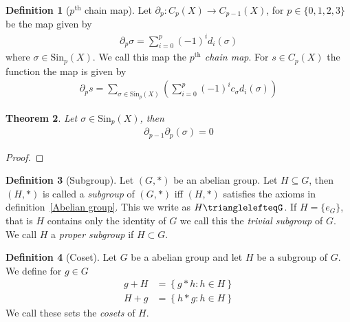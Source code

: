 \documentclass{article}
\theoremstyle{plain}
\newtheorem{theorem}{Theorem}
\theoremstyle{definition}
\newtheorem{definition}[theorem]{Definition}
\newcommand{\Sin}{\text{Sin}}
\newcommand{\del}{\partial}
\begin{document}
\begin{definition}[$p^\text{th}$ chain map]\label{pth chain map}
	Let $\del_p:C_p(X)\rightarrow C_{p-1}(X)$, for $p\in\{0,1,2,3\}$ be the map
	given by
	\begin{equation}
	\begin{aligned}
		\del_p\sigma=\sum^p_{i=0} {(-1)}^i d_i (\sigma)
	\end{aligned}
	\end{equation}
	where $\sigma\in\Sin_p(X)$. We call this map the
	\textit{$p^\text{th}$ chain map}. For $s\in C_p(X)$ the function the map is
	given by
	\begin{equation}
	\begin{aligned}
		\del_ps=\sum_{\sigma\in\Sin_p(X)}\left(\sum^p_{i=0} {(-1)}^i c_\sigma 
			d_i(\sigma)\right)
	\end{aligned}
	\end{equation}
\end{definition}
\begin{theorem}
	Let $\sigma\in\Sin_p(X)$, then
	\begin{equation}
	\begin{aligned}
		\del_{p-1}\del_p(\sigma)=0
	\end{aligned}
	\end{equation}
\end{theorem}
\begin{proof}
\end{proof}
\begin{definition}[Subgroup]\label{subgroup}
	Let $(G,*)$ be an abelian group. Let $H\subseteq G$, then $(H,*)$
	is called a \textit{subgroup} of $(G,*)$ iff $(H,*)$ satisfies
	the axioms in definition~\ref{Abelian group}. This we write as
	$H\trianglelefteqG$. If $H=\{e_G\}$, that is $H$ contains only the
	identity of $G$ we call this the \textit{trivial subgroup} of $G$.
	We call $H$ a \textit{proper subgroup} if $H\subset G$.
\end{definition}
\begin{definition}[Coset]\label{coset}
	Let $G$ be a abelian group and let $H$ be a subgroup of $G$. We define for
	$g\in G$
	\begin{equation}
	\begin{aligned}
		g+H &=\left\{g*h:h\in H\right\}\\
		H+g &=\left\{h*g:h\in H\right\}
	\end{aligned}
	\end{equation}
	We call these sets the \textit{cosets} of $H$.
\end{definition}
\end{document}
